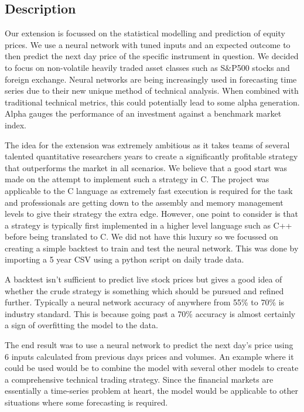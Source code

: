 \documentclass[11pt]{article}
\begin{document}
\subsection{Description}
Our extension is focussed on the statistical modelling and prediction of equity prices. We use a neural network with tuned inputs and an expected outcome to then predict the next day price of the specific instrument in question. We decided to focus on non-volatile heavily traded asset classes such as S\&P500 stocks and foreign exchange. Neural networks are being increasingly used in forecasting time series due to their new unique method of technical analysis. When combined with traditional technical metrics, this could potentially lead to some alpha generation. Alpha gauges the performance of an investment against a benchmark market index. 

The idea for the extension was extremely ambitious as it takes teams of several talented quantitative researchers years to create a significantly profitable strategy that outperforms the market in all scenarios. We believe that a good start was made on the attempt to implement such a strategy in C. The project was applicable to the C language as extremely fast execution is required for the task and professionals are getting down to the assembly and memory management levels to give their strategy the extra edge. However, one point to consider is that a strategy is typically first implemented in a higher level language such as C++ before being translated to C. We did not have this luxury so we focussed on creating a simple backtest to train and test the neural network. This was done by importing a 5 year CSV using a python script on daily trade data. 

A backtest isn't sufficient to predict live stock prices but gives a good idea of whether the crude strategy is something which should be pursued and refined further. Typically a neural network accuracy of anywhere from 55\% to 70\% is industry standard. This is because going past a 70\% accuracy is almost certainly a sign of overfitting the model to the data. 

The end result was to use a neural network to predict the next day's price using 6 inputs calculated from previous days prices and volumes. An example where it could be used would be to combine the model with several other models to create a comprehensive technical trading strategy. Since the financial markets are essentially a time-series problem at heart, the model would be applicable to other situations where some forecasting is required. 
\end{document}
